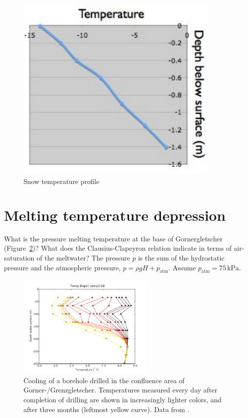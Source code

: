 \documentclass[parskip=half]{scrartcl}
\begin{document}
\begin{figure}
  \centering
  \includegraphics[width=10cm]{figures/cold-content} 
  \caption{Snow temperature profile}
  \label{fig:snow-temp-profile}
\end{figure}

\section{Melting temperature depression}

What is the pressure melting temperature at the base of Gornergletscher (Figure~\ref{fig:temp-profile-gorner})? What does the Clausius-Clapeyron relation indicate in terms of air-saturation of the meltwater? The pressure $p$ is the sum of the hydrostatic pressure and the atmospheric pressure, $p = \rho g H + p_{\text{atm}}$. Assume $p_{\text{atm}} = 75\,\text{kPa}$.

\begin{figure}[tbhp]
 \centering
 \includegraphics[width=0.6\textwidth]{figures/gorner-temp-depth_temp3-08} 
 \caption{Cooling of a borehole drilled in the confluence area of
   Gorner-/Grenzgletscher. Temperatures  measured every day after
   completion of drilling are shown in increasingly lighter colors, and after three months
   (leftmost yellow curve). Data from \cite{Ryser2009}.
   \label{fig:temp-profile-gorner}}
\end{figure}
\end{document}
